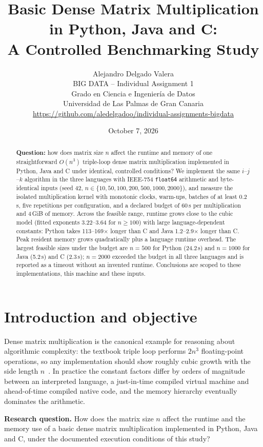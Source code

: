 \documentclass[11pt,a4paper]{article}
\title{\textbf{Basic Dense Matrix Multiplication in Python, Java and C:\\
A Controlled Benchmarking Study}}
\author{Alejandro Delgado Valera\\
\small BIG DATA -- Individual Assignment 1\\
\small Grado en Ciencia e Ingenier{\'i}a de Datos\\
\small Universidad de Las Palmas de Gran Canaria\\
\small \url{https://github.com/aledelgadoo/individual-assignments-bigdata}}
\date{October 7, 2026}
\begin{document}
\maketitle

\begin{abstract}
\noindent\textbf{Question:} how does matrix size $n$ affect the runtime and memory of
one straightforward $O(n^3)$ triple-loop dense matrix multiplication implemented in
Python, Java and C under identical, controlled conditions? We implement the same
$i$--$j$--$k$ algorithm in the three languages with IEEE-754 \texttt{float64}
arithmetic and byte-identical inputs (seed 42, $n \in \{10,50,100,200,500,1000,2000\}$),
and measure the isolated multiplication kernel with monotonic clocks, warm-ups,
batches of at least 0.2\,s, five repetitions per configuration, and a declared budget
of 60\,s per multiplication and 4\,GiB of memory. Across the feasible range, runtime
grows close to the cubic model (fitted exponents 3.22--3.64 for $n \ge 100$) with
large language-dependent constants: Python takes 113--169$\times$ longer than C and
Java 1.2--2.9$\times$ longer than C. Peak resident memory grows quadratically plus a
language runtime overhead. The largest feasible sizes under the budget are $n=500$
for Python (24.2\,s) and $n=1000$ for Java (5.2\,s) and C (2.3\,s); $n=2000$
exceeded the budget in all three languages and is reported as a timeout without an
invented runtime. Conclusions are scoped to these implementations, this machine and
these inputs.
\end{abstract}

\section{Introduction and objective}

Dense matrix multiplication is the canonical example for reasoning about
algorithmic complexity: the textbook triple loop performs $2n^3$ floating-point
operations, so any implementation should show roughly cubic growth with the side
length $n$~\cite{strang2016,cormen2022}. In practice the constant factors differ by
orders of magnitude between an interpreted language, a just-in-time compiled virtual
machine and ahead-of-time compiled native code, and the memory hierarchy eventually
dominates the arithmetic.

\textbf{Research question.} How does the matrix size $n$ affect the runtime and the
memory use of a basic dense matrix multiplication implemented in Python, Java and C,
under the documented execution conditions of this study?
\end{document}
